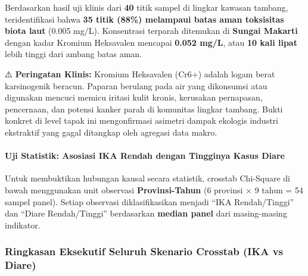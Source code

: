 \documentclass[
]{article}
\begin{document}
Berdasarkan hasil uji klinis dari \textbf{40} titik sampel di lingkar
kawasan tambang, teridentifikasi bahwa \textbf{35 titik (88\%) melampaui
batas aman toksisitas biota laut} (0.005 mg/L). Konsentrasi terparah
ditemukan di \textbf{Sungai Makarti} dengan kadar Kromium Heksavalen
mencapai \textbf{0.052 mg/L}, atau \textbf{10 kali lipat} lebih tinggi
dari ambang batas aman.

⚠️ \textbf{Peringatan Klinis:} Kromium Heksavalen (Cr6+) adalah logam
berat karsinogenik beracun. Paparan berulang pada air yang dikonsumsi
atau digunakan mencuci memicu iritasi kulit kronis, kerusakan
pernapasan, pencernaan, dan potensi kanker parah di komunitas lingkar
tambang. Bukti konkret di level tapak ini mengonfirmasi asimetri dampak
ekologis industri ekstraktif yang gagal ditangkap oleh agregasi data
makro.

\paragraph{Uji Statistik: Asosiasi IKA Rendah dengan Tingginya Kasus
Diare}\label{uji-statistik-asosiasi-ika-rendah-dengan-tingginya-kasus-diare}

Untuk membuktikan hubungan kausal secara statistik, crosstab Chi-Square
di bawah menggunakan unit observasi \textbf{Provinsi-Tahun} (6 provinsi
× 9 tahun = 54 sampel panel). Setiap observasi diklasifikasikan menjadi
``IKA Rendah/Tinggi'' dan ``Diare Rendah/Tinggi'' berdasarkan
\textbf{median panel} dari masing-masing indikator.

\subsubsection{Ringkasan Eksekutif Seluruh Skenario Crosstab (IKA vs
Diare)}\label{ringkasan-eksekutif-seluruh-skenario-crosstab-ika-vs-diare}
\end{document}
